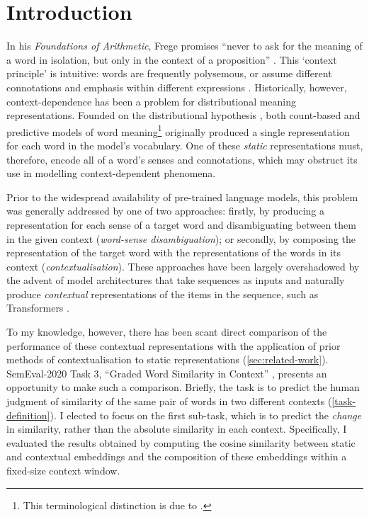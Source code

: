 \section{Introduction}
\label{sec:introduction}

In his \emph{Foundations of Arithmetic}, Frege promises ``never to ask for the meaning
of a word in isolation, but only in the context of a proposition''
\parencite*[xvii]{Frege1980}.
This `context principle' is intuitive: words are frequently polysemous, or assume
different connotations and emphasis within different expressions
\parencite[2-3]{Armendariz2020}.
Historically, however, context-dependence has been a problem for distributional meaning
representations.
Founded on the distributional hypothesis \parencites{Harris1954}{Firth1957}, both
count-based and predictive models of word meaning\footnote{ This terminological
  distinction is due to \textcite{Baroni2014a}.
} originally
produced a single representation for each word in the model's vocabulary.
One of these \emph{static} representations must, therefore, encode all of a word's
senses and connotations, which may obstruct its use in modelling context-dependent
phenomena.

Prior to the widespread availability of pre-trained language models, this problem was
generally addressed by one of two approaches: firstly, by producing a representation
for each sense of a target word and disambiguating between them in the given context
(\emph{word-sense disambiguation}); or secondly, by composing the representation of the
target word with the representations of the words in its context
(\emph{contextualisation}).
These approaches have been largely overshadowed by the advent of model architectures
that take sequences as inputs and naturally produce \emph{contextual} representations
of the items in the sequence, such as Transformers \parencite{Vaswani2017}.

To my knowledge, however, there has been scant direct comparison of the performance of
these contextual representations with the application of prior methods of
contextualisation to static representations (\cref{sec:related-work}).
SemEval-2020 Task 3, ``Graded Word Similarity in Context'' \parencite{Armendariz2020a},
presents an opportunity to make such a comparison.
Briefly, the task is to predict the human judgment of similarity of the same pair of
words in two different contexts (\cref{task-definition}).
I elected to focus on the first sub-task, which is to predict the \emph{change} in
similarity, rather than the absolute similarity in each context.
Specifically, I evaluated the results obtained by computing the cosine similarity
between static and contextual embeddings and the composition of these embeddings within
a fixed-size context window.
